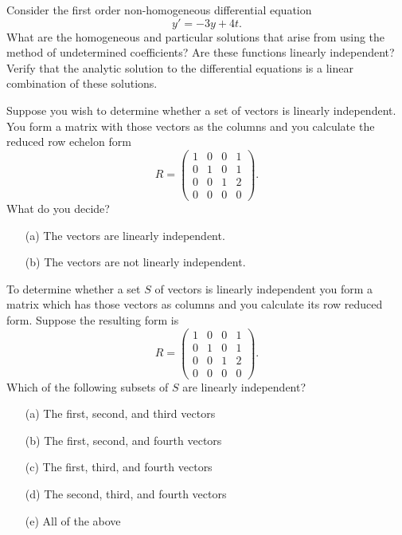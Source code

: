 \begin{problem}
    Consider the first order non-homogeneous differential equation \[ y' = -3y + 4t. \]  What
    are the homogeneous and particular solutions that arise from using the method of
    undetermined coefficients?  Are these functions linearly independent?  Verify that the
    analytic solution to the differential equations is a linear combination of these
    solutions.
\end{problem}


\begin{problem}
    Suppose you wish to determine whether a set of vectors is linearly independent.  You
    form a matrix with those vectors as the columns and you calculate the reduced row
    echelon form
    \[ R = \begin{pmatrix} 1 & 0 & 0 & 1 \\ 0 & 1 & 0 & 1 \\ 0 & 0 & 1 & 2 \\ 0 & 0 & 0 &
            0 \end{pmatrix}. \]
    What do you decide?
    \begin{enumerate}
        \item[(a)] The vectors are linearly independent.
        \item[(b)] The vectors are not linearly independent.
    \end{enumerate}
\end{problem}


\begin{problem}
    To determine whether a set $S$ of vectors is linearly independent you form a matrix
    which has those vectors as columns and you calculate its row reduced form.  Suppose
    the resulting form is 
    \[ R = \begin{pmatrix} 1 & 0 & 0 & 1 \\ 0 & 1 & 0 & 1 \\ 0 & 0 & 1 & 2 \\ 0 & 0 & 0 &
            0 \end{pmatrix}. \]
    Which of the following subsets of $S$ are linearly independent?
    \begin{enumerate}
        \item[(a)] The first, second, and third vectors
        \item[(b)] The first, second, and fourth vectors
        \item[(c)] The first, third, and fourth vectors
        \item[(d)] The second, third, and fourth vectors
        \item[(e)] All of the above
    \end{enumerate}
\end{problem}

